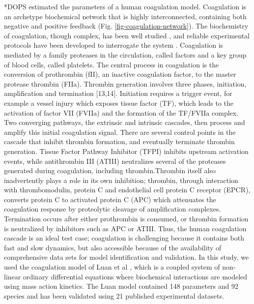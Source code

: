 \documentclass[12pt]{article}
\makeatletter
\renewcommand\subsection{\@startsection
	{subsection}{2}{0mm}
	{-0.05in}
	{-0.5\baselineskip}
	{\normalfont\normalsize\bfseries}}
\makeatother
\begin{document}
\subsection*{DOPS estimated the parameters of a human coagulation model.}
Coagulation is an archetype biochemical network that is highly interconnected, containing both negative and positive feedback (Fig. \ref{fig-coagulation-network}).
The biochemistry of coagulation, though complex, has been well studied \cite{mann2003dynamics,mann2003all,mann2003thrombin,vogler2009contact,diamond2013systems,fogelson2005coagulation,anand2003model},
and reliable experimental protocols have been developed to interrogate the system \cite{hockin2002model,chatterjee2010systems,mann2006models,luan2007computationally}.
Coagulation is mediated by a family proteases in the circulation, called factors and a key group of blood cells, called platelets.
The central process in coagulation is the conversion of prothrombin (fII), an inactive coagulation factor, to the master protease thrombin (FIIa).
Thrombin generation involves three phases, initiation, amplification and termination [13,14].
Initiation requires a trigger event, for example a vessel injury which exposes tissue factor (TF), which leads to the activation of factor VII (FVIIa) and the formation of the TF/FVIIa complex. Two converging pathways, the extrinsic and intrinsic cascades, then process and amplify this initial coagulation signal.
There are several control points in the cascade that inhibit thrombin formation, and eventually terminate thrombin generation.
Tissue Factor Pathway Inhibitor (TFPI) inhibits upstream activation events, while antithrombin III (ATIII) neutralizes several of the proteases generated during coagulation, including thrombin.Thrombin itself also inadvertently plays a role in its own inhibition; thrombin, through interaction with thrombomodulin, protein C and endothelial cell protein C receptor (EPCR), converts protein C to activated protein C (APC) which attenuates the coagulation response by proteolytic cleavage of amplification complexes.
Termination occurs after either prothrombin is consumed, or thrombin formation is neutralized by inhibitors such as APC or ATIII.
Thus, the human coagulation cascade is an ideal test case;
coagulation is challenging because it contains both fast and slow dynamics, but also accessible because of the availability of comprehensive data sets for model identification and validation. In this study, we used the coagulation model of Luan et al \cite{luan2007computationally}, which is a coupled system of non-linear ordinary differential equations where biochemical interactions are modeled using mass action kinetics. The Luan model contained 148 parameters and 92 species and has been validated using 21 published experimental datasets.
\end{document}
